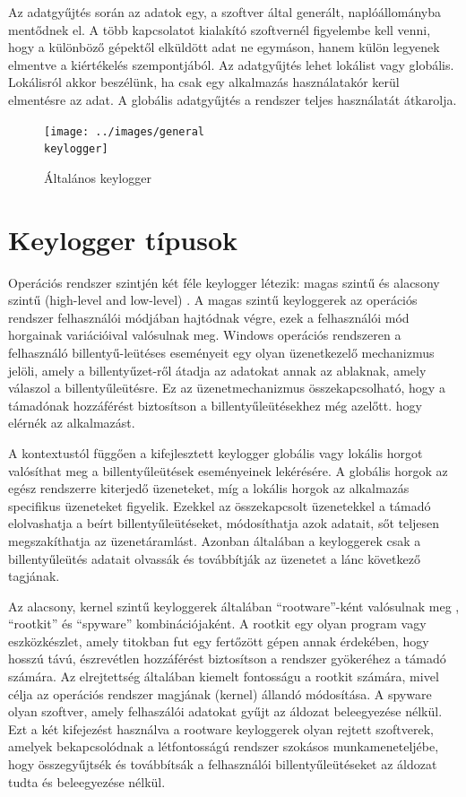 \documentclass[12pt,a4paper,oneside]{report}
\begin{document}
Az adatgyűjtés során az adatok egy, a szoftver által generált, naplóállományba mentődnek el. A több kapcsolatot kialakító szoftvernél figyelembe kell venni, hogy a különböző gépektől elküldött adat ne egymáson, hanem külön legyenek elmentve a kiértékelés szempontjából. Az adatgyűjtés lehet lokálist vagy globális. Lokálisról akkor beszélünk, ha csak egy alkalmazás használatakór kerül elmentésre az adat. A globális adatgyűjtés a rendszer teljes használatát átkarolja.

\begin{figure}[H]
\centering
\texttt{[image: ../images/general\\ keylogger]}
\caption{Általános keylogger}
\label{fig:genkeylogger}
\end{figure}

\section{Keylogger típusok}
Operációs rendszer szintjén két féle keylogger létezik: magas szintű és alacsony szintű (high-level and low-level) \cite{wood2010keyloggers}. A magas szintű keyloggerek az operációs rendszer felhasználói módjában hajtódnak végre, ezek a felhasználói mód horgainak variációival valósulnak meg. Windows operációs rendszeren a felhasználó billentyű-leütéses eseményeit egy olyan üzenetkezelő mechanizmus jelöli, amely a billentyűzet-ről átadja az adatokat annak az ablaknak, amely válaszol a billentyűleütésre. Ez az üzenetmechanizmus összekapcsolható, hogy a támadónak hozzáférést biztosítson a billentyűleütésekhez még azelőtt. hogy elérnék az alkalmazást.

A kontextustól függően a kifejlesztett keylogger globális vagy lokális horgot valósíthat meg a billentyűleütések eseményeinek lekérésére. A globális horgok az egész rendszerre kiterjedő üzeneteket, míg a lokális horgok az alkalmazás specifikus üzeneteket figyelik. Ezekkel az összekapcsolt üzenetekkel a támadó elolvashatja a beírt billentyűleütéseket, módosíthatja azok adatait, sőt teljesen megszakíthatja az üzenetáramlást. Azonban általában a keyloggerek csak a billentyűleütés adatait olvassák és továbbítják az üzenetet a lánc következő tagjának.

Az alacsony, kernel szintű keyloggerek általában ``rootware''-ként valósulnak meg \cite{butler2006r2}, ``rootkit'' és ``spyware'' kombinációjaként. A rootkit egy olyan program vagy eszközkészlet, amely titokban fut egy fertőzött gépen annak érdekében, hogy hosszú távú, észrevétlen hozzáférést biztosítson a rendszer gyökeréhez a támadó számára. Az elrejtettség általában kiemelt fontosságu a rootkit számára, mivel célja az operációs rendszer magjának (kernel) állandó módosítása. A spyware olyan szoftver, amely felhaszálói adatokat gyűjt az áldozat beleegyezése nélkül. Ezt a két kifejezést használva a rootware keyloggerek olyan rejtett szoftverek, amelyek bekapcsolódnak a létfontosságú rendszer szokásos munkameneteljébe, hogy összegyűjtsék és továbbítsák a felhasználói billentyűleütéseket az áldozat tudta és beleegyezése nélkül.
\end{document}

